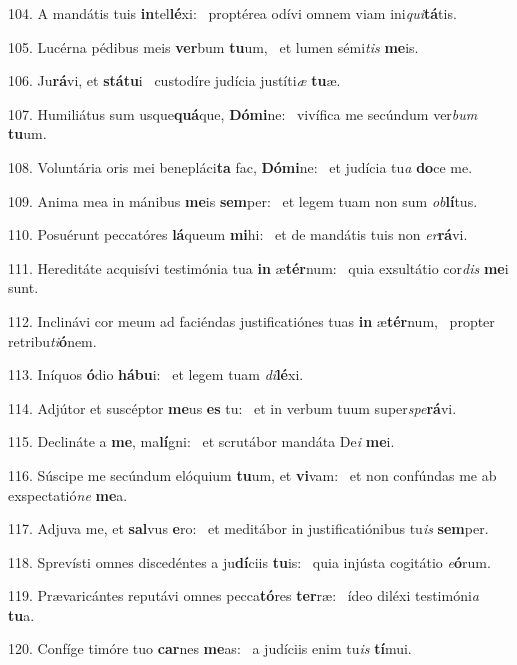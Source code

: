 104. A mandátis tuis \textbf{in}tel\textbf{lé}xi: \ast\  proptérea odívi omnem viam ini\textit{qui}\textbf{tá}tis.\

105. Lucérna pédibus meis \textbf{ver}bum \textbf{tu}um, \ast\  et lumen sémi\textit{tis} \textbf{me}is.\

106. Ju\textbf{rá}vi, et \textbf{stá}\textbf{tu}i \ast\  custodíre judícia justíti\textit{æ} \textbf{tu}æ.\

107. Humiliátus sum usque\textbf{quá}que, \textbf{Dó}\textbf{mi}ne: \ast\  vivífica me secúndum ver\textit{bum} \textbf{tu}um.\

108. Voluntária oris mei benepláci\textbf{ta} fac, \textbf{Dó}\textbf{mi}ne: \ast\  et judícia tu\textit{a} \textbf{do}ce me.\

109. Anima mea in mánibus \textbf{me}is \textbf{sem}per: \ast\  et legem tuam non sum \textit{ob}\textbf{lí}tus.\

110. Posuérunt peccatóres \textbf{lá}queum \textbf{mi}hi: \ast\  et de mandátis tuis non \textit{er}\textbf{rá}vi.\

111. Hereditáte acquisívi testimónia tua \textbf{in} æ\textbf{tér}num: \ast\  quia exsultátio cor\textit{dis} \textbf{me}i sunt.\

112. Inclinávi cor meum ad faciéndas justificatiónes tuas \textbf{in} æ\textbf{tér}num, \ast\  propter retribu\textit{ti}\textbf{ó}nem.\

113. Iníquos \textbf{ó}dio \textbf{há}\textbf{bu}i: \ast\  et legem tuam \textit{di}\textbf{lé}xi.\

114. Adjútor et suscéptor \textbf{me}us \textbf{es} tu: \ast\  et in verbum tuum super\textit{spe}\textbf{rá}vi.\

115. Declináte a \textbf{me}, ma\textbf{lí}gni: \ast\  et scrutábor mandáta De\textit{i} \textbf{me}i.\

116. Súscipe me secúndum elóquium \textbf{tu}um, et \textbf{vi}vam: \ast\  et non confúndas me ab exspectatió\textit{ne} \textbf{me}a.\

117. Adjuva me, et \textbf{sal}vus \textbf{e}ro: \ast\  et meditábor in justificatiónibus tu\textit{is} \textbf{sem}per.\

118. Sprevísti omnes discedéntes a ju\textbf{dí}ciis \textbf{tu}is: \ast\  quia injústa cogitátio \textit{e}\textbf{ó}rum.\

119. Prævaricántes reputávi omnes pecca\textbf{tó}res \textbf{ter}ræ: \ast\  ídeo diléxi testimóni\textit{a} \textbf{tu}a.\

120. Confíge timóre tuo \textbf{car}nes \textbf{me}as: \ast\  a judíciis enim tu\textit{is} \textbf{tí}mui.\


